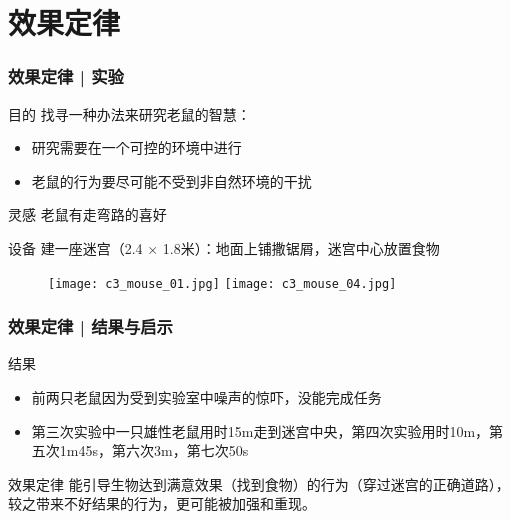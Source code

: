 \section{效果定律}
\begin{frame}
  \frametitle{效果定律 | 实验}
    \vspace{-0.5em}
  \begin{block}{目的}
    找寻一种办法来研究老鼠的智慧：
    \begin{itemize}
      \item 研究需要在一个可控的环境中进行
      \item 老鼠的行为要尽可能不受到非自然环境的干扰
    \end{itemize}
  \end{block}
    \vspace{-0.5em}
  \pause
  \begin{block}{灵感}
    老鼠有走弯路的喜好
  \end{block}
    \vspace{-0.5em}
  \pause
  \begin{block}{设备}
    建一座迷宫（2.4 $\times$ 1.8米）：地面上铺撒锯屑，迷宫中心放置食物
    \vspace{-1em}
    \begin{figure}
      \centering
      \texttt{[image: c3\_mouse\_01.jpg]}\quad
      \texttt{[image: c3\_mouse\_04.jpg]}
    \end{figure}
  \end{block}
\end{frame}

\begin{frame}
  \frametitle{效果定律 | 结果与启示}
  \begin{block}{结果}
    \begin{itemize}
      \item 前两只老鼠因为受到实验室中噪声的惊吓，没能完成任务
      \item 第三次实验中一只雄性老鼠用时15m走到迷宫中央，第四次实验用时10m，第五次1m45s，第六次3m，第七次50s
    \end{itemize}
  \end{block}
  \pause
  \begin{block}{效果定律}
    能引导生物达到满意效果（找到食物）的行为（穿过迷宫的正确道路），较之带来不好结果的行为，更可能被加强和重现。
  \end{block}
\end{frame}

